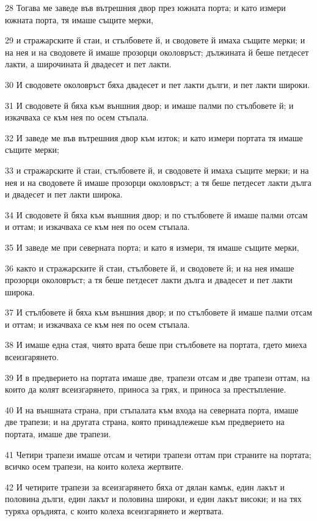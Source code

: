 \par 28 Тогава ме заведе във вътрешния двор през южната порта; и като измери южната порта, тя имаше същите мерки,
\par 29 и стражарските й стаи, и стълбовете й, и сводовете й имаха същите мерки; и на нея и на сводовете й имаше прозорци околовръст; дължината й беше петдесет лакти, а широчината й двадесет и пет лакти.
\par 30 И сводовете околовръст бяха двадесет и пет лакти дълги, и пет лакти широки.
\par 31 И сводовете й бяха към външния двор; и имаше палми по стълбовете й; и изкачваха се към нея по осем стъпала.
\par 32 И заведе ме във вътрешния двор към изток; и като измери портата тя имаше същите мерки;
\par 33 и стражарските й стаи, стълбовете й, и сводовете й имаха същите мерки; и на нея и на сводовете й имаше прозорци околовръст; а тя беше петдесет лакти дълга и двадесет и пет лакти широка.
\par 34 И сводовете й бяха към външния двор; и по стълбовете й имаше палми отсам и оттам; и изкачваха се към нея по осем стъпала.
\par 35 И заведе ме при северната порта; и като я измери, тя имаше същите мерки,
\par 36 както и стражарските й стаи, стълбовете й, и сводовете й; и на нея имаше прозорци околовръст; а тя беше петдесет лакти дълга и двадесет и пет лакти широка.
\par 37 И стълбовете й бяха към външния двор; и по стълбовете й имаше палми отсам и оттам; и изкачваха се към нея по осем стъпала.
\par 38 И имаше една стая, чиято врата беше при стълбовете на портата, гдето миеха всеизгарянето.
\par 39 И в предверието на портата имаше две, трапези отсам и две трапези оттам, на които да колят всеизгарянето, приноса за грях, и приноса за престъпление.
\par 40 И на външната страна, при стъпалата към входа на северната порта, имаше две трапези; и на другата страна, която принадлежеше към предверието на портата, имаше две трапези.
\par 41 Четири трапези имаше отсам и четири трапези оттам при страните на портата; всичко осем трапези, на които колеха жертвите.
\par 42 И четирите трапези за всеизгарянето бяха от дялан камък, един лакът и половина дълги, един лакът и половина широки, и един лакът високи; и на тях туряха оръдията, с които колеха всеизгарянето и жертвата.
